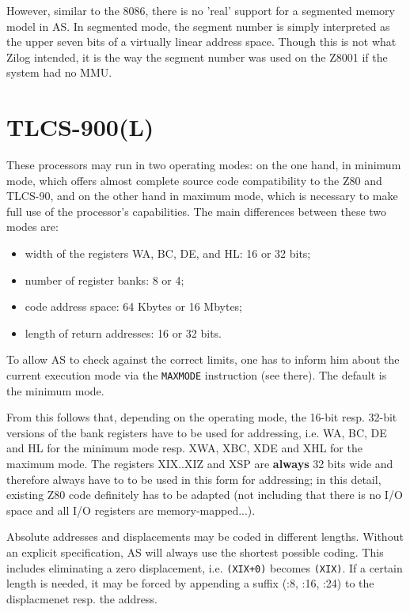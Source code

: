 \documentclass[12pt,twoside]{report}
\newcommand{\bb}[1]{{\bf #1}}
\newcommand{\tty}[1]{{\tt #1}}
\begin{document}
However, similar to the 8086, there is no 'real' support for a segmented
memory model in AS. In segmented mode, the segment number is simply interpreted
as the upper seven bits of a virtually linear address space.  Though this is
not what Zilog intended, it is the way the segment number was used on the
Z8001 if the system had no MMU.


\section{TLCS-900(L)}
\label{TLCS900Spec}

These processors may run in two operating modes: on the one hand, in
minimum mode, which offers almost complete source code compatibility
to the Z80 and TLCS-90, and on the other hand in maximum mode, which
is necessary to make full use of the processor's capabilities.  The
main differences between these two modes are:
\begin{itemize}
\item{width of the registers WA, BC, DE, and HL: 16 or 32 bits;}
\item{number of register banks: 8 or 4;}
\item{code address space: 64 Kbytes or 16 Mbytes;}
\item{length of return addresses: 16 or 32 bits.}
\end{itemize}
To allow AS to check against the correct limits, one has to inform him
about the current execution mode via the \tty{MAXMODE} instruction (see
there).  The default is the minimum mode.

From this follows that, depending on the operating mode, the 16-bit
resp. 32-bit versions of the bank registers have to be used for
addressing, i.e. WA, BC, DE and HL for the minimum mode resp. XWA,
XBC, XDE and XHL for the maximum mode.  The registers XIX..XIZ and
XSP are \bb{always} 32 bits wide and therefore always have to to be used
in this form for addressing; in this detail, existing Z80 code
definitely has to be adapted (not including that there is no I/O
space and all I/O registers are memory-mapped...).

Absolute addresses and displacements may be coded in different
lengths.  Without an explicit specification, AS will always use
the shortest possible coding.  This includes eliminating a zero
displacement, i.e. \verb!(XIX+0)! becomes \verb!(XIX)!.  If a certain
length is needed, it may be forced by appending a suffix (:8, :16,
:24) to the displacmenet resp. the address.
\end{document}
